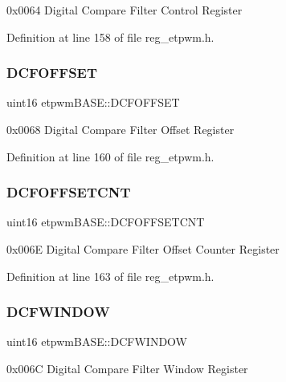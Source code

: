 0x0064 Digital Compare Filter Control Register 

Definition at line 158 of file reg\+\_\+etpwm.\+h.

\mbox{\label{structetpwmBASE_ac1ffacf30f5476825f12bfee42f70c18}} 
\subsubsection{\texorpdfstring{D\+C\+F\+O\+F\+F\+S\+ET}{DCFOFFSET}}
{\footnotesize\ttfamily uint16 etpwm\+B\+A\+S\+E\+::\+D\+C\+F\+O\+F\+F\+S\+ET}

0x0068 Digital Compare Filter Offset Register 

Definition at line 160 of file reg\+\_\+etpwm.\+h.

\mbox{\label{structetpwmBASE_a3c5ac0ffaa3345df270b8c636be2c5b3}} 
\subsubsection{\texorpdfstring{D\+C\+F\+O\+F\+F\+S\+E\+T\+C\+NT}{DCFOFFSETCNT}}
{\footnotesize\ttfamily uint16 etpwm\+B\+A\+S\+E\+::\+D\+C\+F\+O\+F\+F\+S\+E\+T\+C\+NT}

0x006E Digital Compare Filter Offset Counter Register 

Definition at line 163 of file reg\+\_\+etpwm.\+h.

\mbox{\label{structetpwmBASE_afa47b60389f0f31b26f6a348c6638823}} 
\subsubsection{\texorpdfstring{D\+C\+F\+W\+I\+N\+D\+OW}{DCFWINDOW}}
{\footnotesize\ttfamily uint16 etpwm\+B\+A\+S\+E\+::\+D\+C\+F\+W\+I\+N\+D\+OW}

0x006C Digital Compare Filter Window Register 


